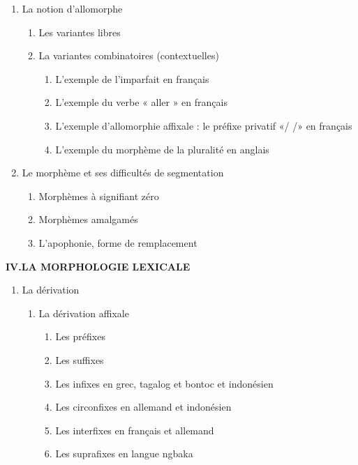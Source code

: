 \begin{keybox}
\begin{enumerate}[label=\arabic*.]
\item La notion d’allomorphe
\begin{enumerate}[label=\textcircled{\scriptsize\arabic*}]
\item Les variantes libres
\item La variantes combinatoires (contextuelles)
\begin{enumerate}[label=\arabic*.]
\item L’exemple de l’imparfait en français
\item L’exemple du verbe « aller » en français
\item L’exemple d’allomorphie affixale : le préfixe privatif «/  /» en français
\item L’exemple du morphème de la pluralité en anglais
\end{enumerate}
\end{enumerate}
\item Le morphème et ses difficultés de segmentation
\begin{enumerate}[label=\textcircled{\scriptsize\arabic*}]
\item Morphèmes à signifiant zéro
\item Morphèmes amalgamés
\item L’apophonie, forme de remplacement
\end{enumerate}
\end{enumerate}
\textbf{IV.\quad LA MORPHOLOGIE LEXICALE}
\begin{enumerate}[label=\arabic*.]
\item La dérivation
\begin{enumerate}[label=\textcircled{\scriptsize\arabic*}]
\item La dérivation affixale
\begin{enumerate}[label=\arabic*.]
\item Les préfixes
\item Les suffixes
\item Les infixes en grec, tagalog et bontoc et indonésien
\item Les circonfixes en allemand et indonésien
\item Les interfixes en français et allemand
\item Les suprafixes en langue ngbaka
\end{enumerate}

\end{enumerate}
\end{enumerate}
\end{keybox}
